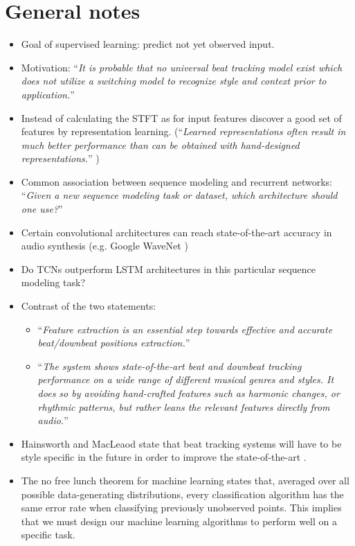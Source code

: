 \documentclass{scrartcl}
\begin{document}
\newpage

\section*{General notes}
\begin{itemize}
\item Goal of supervised learning: predict not yet observed input.
\item Motivation: ``\emph{It is probable that no universal beat tracking model exist which does not utilize a switching model to recognize style and context prior to application.}'' \cite{Collins2006}
\item Instead of calculating the STFT as for input features discover a good set of features by representation learning. (``\emph{Learned representations often result in much better performance than can be obtained with hand-designed representations.}'' \cite{Goodfellow2016})
\item Common association between sequence modeling and recurrent networks: ``\emph{Given a new sequence modeling task or dataset, which architecture should one use?}'' \cite{Bai2018}
\item Certain convolutional architectures can reach state-of-the-art accuracy in audio synthesis (e.g. Google WaveNet \cite{Oord2016})
\item Do TCNs outperform LSTM architectures in this particular sequence modeling task?
\item Contrast of the two statements:
\begin{itemize}
\item ``\emph{Feature extraction is an essential step towards effective and accurate beat/downbeat positions extraction.}'' \cite{Khadkevich2012}
\item ``\emph{The system shows state-of-the-art beat and downbeat tracking performance on a wide range of different musical genres and styles. It does so by avoiding hand-crafted features such as harmonic changes, or rhythmic patterns, but rather leans the relevant features directly from audio.}'' \cite{Boeck2016b}
\end{itemize} 
\item Hainsworth and MacLeaod state that beat tracking systems will have to be style specific in the future in order to improve the state-of-the-art \cite{Hainsworth2004}.
\item The no free lunch theorem for machine learning \cite{Wolpert1996} states that, averaged over all possible data-generating distributions, every classification algorithm has the same error rate when classifying previously unobserved points. This implies that we must design our machine learning algorithms to perform well on a specific task.

\end{itemize}
\end{document}
